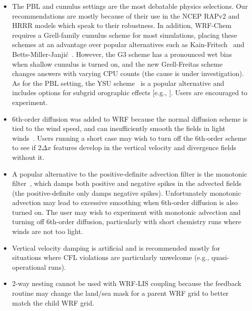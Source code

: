 \begin{itemize}

\item The PBL and cumulus settings are the most debatable physics selections.
Our recommendations are mostly because of their use in the NCEP RAPv2 and 
HRRR models which speak to their robustness. In addition, WRF-Chem requires a 
Grell-family cumulus scheme for most simulations, placing these schemes at an 
advantage over popular alternatives such as Kain-Fritsch~\citep{ref:Kain2004}
and Betts-Miller-Janji\'{c}~\citep{ref:Janjic1994}. However, the G3 scheme has
a pronounced wet bias when shallow cumulus is turned on, and the new 
Grell-Freitas scheme~\citep{ref:GrellFreitas2014} changes answers with varying
 CPU counts (the cause is under investigation).  As for the PBL setting, the 
YSU scheme~\citep{ref:HongEtAl2006} is a popular alternative and includes 
options for subgrid orographic effects [e.g., \cite{ref:JimenezDudhia2012}].  
Users are encouraged to experiment.

\item 6th-order diffusion was added to WRF because the normal diffusion scheme
is tied to the wind speed, and can insufficiently smooth the fields in light
winds~\citep{ref:KnievelEtAl2007}. Users running a short case may wish to turn
off the 6th-order scheme to see if $2\Delta{}x$ features develop in the 
vertical velocity and divergence fields without it.

\item A popular alternative to the positive-definite advection filter is the
monotonic filter~\citep{ref:WangEtAl2009}, which damps both positive and 
negative spikes in the advected fields (the positive-definite only damps 
negative spikes). Unfortunately monotonic advection may lead to excessive 
smoothing when 6th-order diffusion is also turned on. The user may wish to 
experiment with monotonic advection and turning off 6th-order diffusion, 
particularly with short chemistry runs where winds are not too light.

\item Vertical velocity damping is artificial and is recommended mostly for
situations where CFL violations are particularly unwelcome (e.g., quasi-
operational runs).

\item 2-way nesting cannot be used with WRF-LIS coupling because the feedback
routine may change the land/sea mask for a parent WRF grid to better match
the child WRF grid.

\end{itemize}

